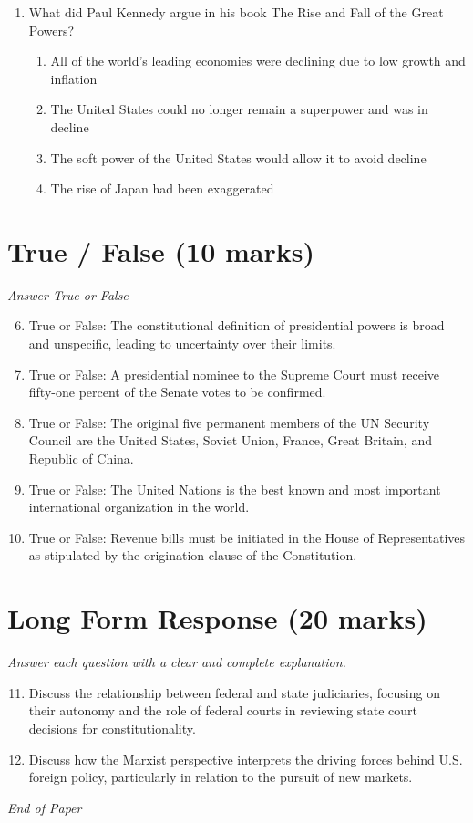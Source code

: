 \documentclass[12pt]{article}
\begin{document}
\begin{enumerate}[label=\arabic*.]
\begin{enumerate}[label=(\alph*)]
    \item reduce the federal deficit
    \item limit the president's ability to conduct foreign policy
\end{enumerate}
\item What did Paul Kennedy argue in his book The Rise and Fall of the Great Powers?
\begin{enumerate}[label=(\alph*)]
    \item All of the world's leading economies were declining due to low growth and inflation
    \item The United States could no longer remain a superpower and was in decline
    \item The soft power of the United States would allow it to avoid decline
    \item The rise of Japan had been exaggerated
\end{enumerate}
\end{enumerate}

\section*{True / False (10 marks)}
\textit{Answer True or False}
\begin{enumerate}[label=\arabic*.]
\setcounter{enumi}{5}
\item True or False: The constitutional definition of presidential powers is broad and unspecific, leading to uncertainty over their limits.
\item True or False: A presidential nominee to the Supreme Court must receive fifty-one percent of the Senate votes to be confirmed.
\item True or False: The original five permanent members of the UN Security Council are the United States, Soviet Union, France, Great Britain, and Republic of China.
\item True or False: The United Nations is the best known and most important international organization in the world.
\item True or False: Revenue bills must be initiated in the House of Representatives as stipulated by the origination clause of the Constitution.
\end{enumerate}

\section*{Long Form Response (20 marks)}
\textit{Answer each question with a clear and complete explanation.}
\begin{enumerate}[label=\arabic*.]
\setcounter{enumi}{10}
\item Discuss the relationship between federal and state judiciaries, focusing on their autonomy and the role of federal courts in reviewing state court decisions for constitutionality.
\item Discuss how the Marxist perspective interprets the driving forces behind U.S. foreign policy, particularly in relation to the pursuit of new markets.
\end{enumerate}

\vfill
\noindent\textit{End of Paper}
\end{document}
